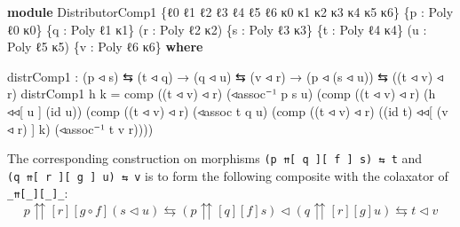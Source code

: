 \documentclass[
  11pt,
  oneside,
  article]{memoir}
\newenvironment{Shaded}{}{}
\newcommand{\KeywordTok}[1]{\textcolor[rgb]{0.00,0.44,0.13}{\textbf{#1}}}
\newcommand{\NormalTok}[1]{#1}
\newcommand{\OtherTok}[1]{\textcolor[rgb]{0.00,0.44,0.13}{#1}}
\theoremstyle{definition}
\theoremstyle{plain}
\newcommand{\0}{\textsf{0}}
\newcommand{\1}{\tn{\textsf{1}}}
\begin{document}
\begin{Shaded}
\begin{Highlighting}[]
\KeywordTok{module}\NormalTok{ DistributorComp1 }\OtherTok{\{}\NormalTok{ℓ0 ℓ1 ℓ2 ℓ3 ℓ4 ℓ5 ℓ6 κ0 κ1 κ2 κ3 κ4 κ5 κ6}\OtherTok{\}}
                        \OtherTok{\{}\NormalTok{p }\OtherTok{:}\NormalTok{ Poly ℓ0 κ0}\OtherTok{\}} \OtherTok{\{}\NormalTok{q }\OtherTok{:}\NormalTok{ Poly ℓ1 κ1}\OtherTok{\}} \OtherTok{(}\NormalTok{r }\OtherTok{:}\NormalTok{ Poly ℓ2 κ2}\OtherTok{)}
                        \OtherTok{\{}\NormalTok{s }\OtherTok{:}\NormalTok{ Poly ℓ3 κ3}\OtherTok{\}} \OtherTok{\{}\NormalTok{t }\OtherTok{:}\NormalTok{ Poly ℓ4 κ4}\OtherTok{\}}
                        \OtherTok{(}\NormalTok{u }\OtherTok{:}\NormalTok{ Poly ℓ5 κ5}\OtherTok{)} \OtherTok{\{}\NormalTok{v }\OtherTok{:}\NormalTok{ Poly ℓ6 κ6}\OtherTok{\}} \KeywordTok{where}

\NormalTok{    distrComp1 }\OtherTok{:} \OtherTok{(}\NormalTok{p ◃ s}\OtherTok{)}\NormalTok{ ⇆ }\OtherTok{(}\NormalTok{t ◃ q}\OtherTok{)} \OtherTok{→} \OtherTok{(}\NormalTok{q ◃ u}\OtherTok{)}\NormalTok{ ⇆ }\OtherTok{(}\NormalTok{v ◃ r}\OtherTok{)}
                 \OtherTok{→} \OtherTok{(}\NormalTok{p ◃ }\OtherTok{(}\NormalTok{s ◃ u}\OtherTok{))}\NormalTok{ ⇆ }\OtherTok{((}\NormalTok{t ◃ v}\OtherTok{)}\NormalTok{ ◃ r}\OtherTok{)}
\NormalTok{    distrComp1 h k }\OtherTok{=} 
\NormalTok{        comp }\OtherTok{((}\NormalTok{t ◃ v}\OtherTok{)}\NormalTok{ ◃ r}\OtherTok{)} \OtherTok{(}\NormalTok{◃assoc⁻¹ p s u}\OtherTok{)} 
             \OtherTok{(}\NormalTok{comp }\OtherTok{((}\NormalTok{t ◃ v}\OtherTok{)}\NormalTok{ ◃ r}\OtherTok{)} \OtherTok{(}\NormalTok{h ◃◃[ u ] }\OtherTok{(}\NormalTok{id u}\OtherTok{))} 
                   \OtherTok{(}\NormalTok{comp }\OtherTok{((}\NormalTok{t ◃ v}\OtherTok{)}\NormalTok{ ◃ r}\OtherTok{)} \OtherTok{(}\NormalTok{◃assoc t q u}\OtherTok{)} 
                         \OtherTok{(}\NormalTok{comp }\OtherTok{((}\NormalTok{t ◃ v}\OtherTok{)}\NormalTok{ ◃ r}\OtherTok{)} \OtherTok{((}\NormalTok{id t}\OtherTok{)}\NormalTok{ ◃◃[ }\OtherTok{(}\NormalTok{v ◃ r}\OtherTok{)}\NormalTok{ ] k}\OtherTok{)} 
                               \OtherTok{(}\NormalTok{◃assoc⁻¹ t v r}\OtherTok{))))}
\end{Highlighting}
\end{Shaded}

The corresponding construction on morphisms
\texttt{(p\ ⇈{[}\ q\ {]}{[}\ f\ {]}\ s)\ ⇆\ t} and
\texttt{(q\ ⇈{[}\ r\ {]}{[}\ g\ {]}\ u)\ ⇆\ v} is to form the following
composite with the colaxator of \texttt{\_⇈{[}\_{]}{[}\_{]}\_}: \[
p {\upuparrows}[r][g \circ f] (s \triangleleft u) \leftrightarrows (p {\upuparrows}[q][f] s) \triangleleft (q {\upuparrows}[r][g] u) \leftrightarrows t \triangleleft v
\]
\end{document}
